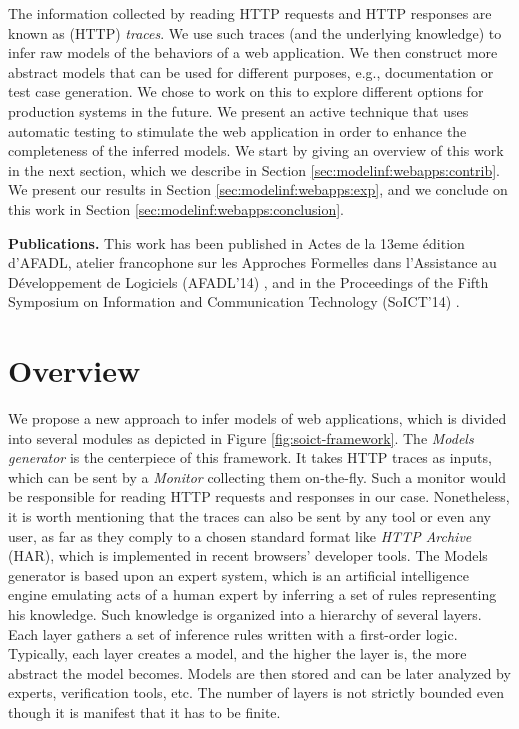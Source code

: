The information collected by reading HTTP requests and HTTP
responses are known as (HTTP) \textit{traces}. We use such traces
(and the underlying knowledge) to infer raw models of the
behaviors of a web application. We then construct more abstract
models that can be used for different purposes, e.g.,
documentation or test case generation. We chose to work on this
to explore different options for production systems in the
future. We present an active technique that uses automatic
testing to stimulate the web application in order to enhance the
completeness of the inferred models.
We start by giving an overview of this work in the next section,
which we describe in Section \ref{sec:modelinf:webapps:contrib}.
We present our results in Section \ref{sec:modelinf:webapps:exp},
and we conclude on this work in Section
\ref{sec:modelinf:webapps:conclusion}.

\textbf{Publications.} This work has been published in Actes de
la 13eme {\'e}dition d’AFADL, atelier francophone sur les
Approches Formelles dans l’Assistance au D{\'e}veloppement de
Logiciels (AFADL'14) \cite{durand2014inference}, and in the
Proceedings of the Fifth Symposium on Information and
Communication Technology (SoICT'14)
\cite{DBLP:conf/soict/DurandS14}.


\section{Overview}

We propose a new approach to infer models of web applications,
which is divided into several modules as depicted in Figure
\ref{fig:soict-framework}. The \textit{Models generator} is the
centerpiece of this framework. It takes HTTP traces as inputs,
which can be sent by a \textit{Monitor} collecting them on-the-fly.
Such a monitor would be responsible for reading HTTP requests and
responses in our case. Nonetheless, it is worth mentioning that the
traces can also be sent by any tool or even any user, as far as
they comply to a chosen standard format like \textit{HTTP
Archive} (HAR), which is implemented in recent browsers'
developer tools. The Models generator is based upon an expert
system, which is an artificial intelligence engine emulating acts
of a human expert by inferring a set of rules representing his
knowledge.  Such knowledge is organized into a hierarchy of
several layers.  Each layer gathers a set of inference rules
written with a first-order logic. Typically, each layer creates a
model, and the higher the layer is, the more abstract the model
becomes. Models are then stored and can be later analyzed by
experts, verification tools, etc. The number of layers is not
strictly bounded even though it is manifest that it has to be
finite.

